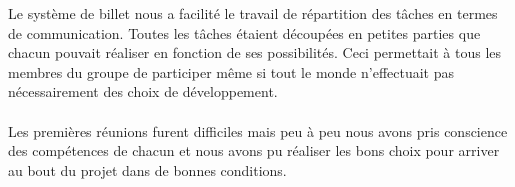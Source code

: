 Le système de billet nous a facilité le travail de répartition des tâches en termes de communication. Toutes les tâches étaient découpées en petites parties que chacun pouvait réaliser en fonction de ses possibilités. Ceci permettait à tous les membres du groupe de participer même si tout le monde n’effectuait pas nécessairement des choix de développement.
\paragraph{}

Les premières réunions furent difficiles mais peu à peu nous avons pris conscience des compétences de chacun et nous avons pu réaliser les bons choix pour arriver au bout du projet dans de bonnes conditions.




